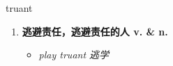 
\begin{frame}
{\huge truant}
\begin{center}
\begin{enumerate}\Large
  \item \textbf{逃避责任，逃避责任的人 v. \& n.}
  \begin{itemize}
    \item \em{\Large{play truant 逃学}}
  \end{itemize}
\end{enumerate}
\end{center}
\end{frame}
